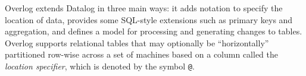 Overlog extends Datalog in three main ways: it adds notation to
specify the location of data, provides some SQL-style extensions such
as primary keys and aggregation, and defines a model for processing
and generating changes to tables.  Overlog supports relational tables
that may optionally be ``horizontally'' partitioned row-wise across a
set of machines based on a column called the \emph{location specifier},
which is denoted by the symbol {\tt @}.
% 
% 

